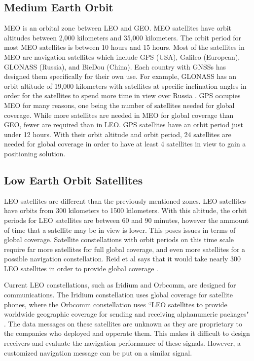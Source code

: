 \documentclass[12pt]{report}
\begin{document}
\subsection{Medium Earth Orbit}
MEO is an orbital zone between LEO and GEO. MEO satellites have orbit altitudes between 2,000 kilometers and 35,000 kilometers. The orbit period for most MEO satellites is between 10 hours and 15 hours. Most of the satellites in MEO are navigation satellites which include GPS (USA), Galileo (European), GLONASS (Russia), and BieDou (China). Each country with GNSSs has designed them specifically for their own use. For example, GLONASS has an orbit altitude of 19,000 kilometers with satellites at specific inclination angles in order for the satellites to spend more time in view over Russia \cite{GLONASSInterfaceControl1998a}. GPS occupies MEO for many reasons, one being the number of satellites needed for global coverage. While more satellites are needed in MEO for global coverage than GEO, fewer are required than in LEO. GPS satellites have an orbit period just under 12 hours. With their orbit altitude and orbit period, 24 satellites are needed for global coverage in order to have at least 4 satellites in view to gain a positioning solution.  

\subsection{Low Earth Orbit Satellites}
LEO satellites are different than the previously mentioned zones. LEO satellites have orbits from 300 kilometers to 1500 kilometers. With this altitude, the orbit periods for LEO satellites are between 60 and 90 minutes, however the ammount of time that a satellite may be in view is lower. This poses issues in terms of global coverage. Satellite constellations with orbit periods on this time scale require far more satellites for full global coverage, and even more satellites for a possible navigation constellation. Reid et al says that it would take nearly 300 LEO satellites in order to provide global coverage \cite{reidSatelliteNavigationAge2020}. 

Current LEO constellations, such as Iridium and Orbcomm, are designed for communications. The Iridium constellation uses global coverage for satellite phones, where the Orbcomm constellation uses ``LEO satellites to provide worldwide geographic coverage for sending and receiving alphanumeric packages" \cite{orabiOpportunisticNavigationDoppler2021}. The data messages on these satellites are unknown as they are proprietary to the companies who deployed and opperate them. This makes it difficult to design receivers and evaluate the navigation performance of these signals. However, a customized navigation message can be put on a similar signal. 
\end{document}
